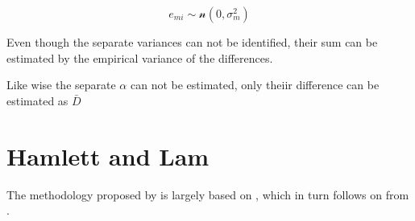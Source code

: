 \documentclass[MAIN.tex]{subfiles}
\begin{document}
\[e_{mi} \sim \mathcal{n} (0,\sigma^2_m)\]

Even though the separate variances can not be
identified, their sum can be estimated by the empirical variance of the differences.

Like wise the separate $\alpha$ can not be
estimated, only theiir difference can be estimated as
$\bar{D}$

\section{Hamlett and Lam}
The methodology proposed by \citet{Roy2009} is largely based on \citet{hamlett}, which in turn follows on from \citet{lam}.





	
	
	
\end{document}
